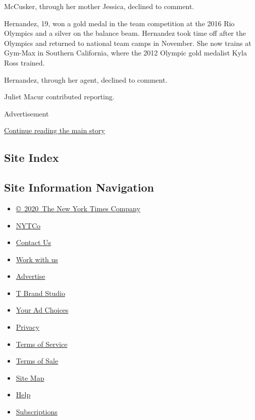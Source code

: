 McCusker, through her mother Jessica, declined to comment.

Hernandez, 19, won a gold medal in the team competition at the 2016 Rio
Olympics and a silver on the balance beam. Hernandez took time off after
the Olympics and returned to national team camps in November. She now
trains at Gym-Max in Southern California, where the 2012 Olympic gold
medalist Kyla Ross trained.

Hernandez, through her agent, declined to comment.

Juliet Macur contributed reporting.

Advertisement

\protect\hyperlink{after-bottom}{Continue reading the main story}

\hypertarget{site-index}{%
\subsection{Site Index}\label{site-index}}

\hypertarget{site-information-navigation}{%
\subsection{Site Information
Navigation}\label{site-information-navigation}}

\begin{itemize}
\tightlist
\item
  \href{https://help.nytimes.com/hc/en-us/articles/115014792127-Copyright-notice}{©~2020~The
  New York Times Company}
\end{itemize}

\begin{itemize}
\tightlist
\item
  \href{https://www.nytco.com/}{NYTCo}
\item
  \href{https://help.nytimes.com/hc/en-us/articles/115015385887-Contact-Us}{Contact
  Us}
\item
  \href{https://www.nytco.com/careers/}{Work with us}
\item
  \href{https://nytmediakit.com/}{Advertise}
\item
  \href{http://www.tbrandstudio.com/}{T Brand Studio}
\item
  \href{https://www.nytimes.com/privacy/cookie-policy\#how-do-i-manage-trackers}{Your
  Ad Choices}
\item
  \href{https://www.nytimes.com/privacy}{Privacy}
\item
  \href{https://help.nytimes.com/hc/en-us/articles/115014893428-Terms-of-service}{Terms
  of Service}
\item
  \href{https://help.nytimes.com/hc/en-us/articles/115014893968-Terms-of-sale}{Terms
  of Sale}
\item
  \href{https://spiderbites.nytimes.com}{Site Map}
\item
  \href{https://help.nytimes.com/hc/en-us}{Help}
\item
  \href{https://www.nytimes.com/subscription?campaignId=37WXW}{Subscriptions}
\end{itemize}
